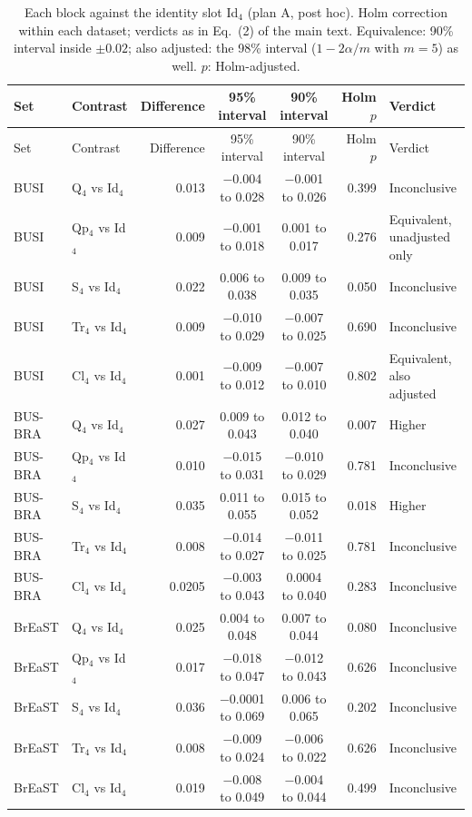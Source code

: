 \begin{longtable}{@{}llrccrl@{}}
\caption{Each block against the identity slot Id$_4$ (plan A, post hoc). Holm correction within each dataset; verdicts as in Eq.~(2) of the main text. Equivalence: 90\% interval inside $\pm0.02$; also adjusted: the 98\% interval ($1-2\alpha/m$ with $m=5$) as well. $p$: Holm-adjusted.}\label{stab:identity}\\
\toprule
Set & Contrast & Difference & 95\% interval & 90\% interval & Holm $p$ & Verdict \\
\midrule
\endfirsthead
\toprule
Set & Contrast & Difference & 95\% interval & 90\% interval & Holm $p$ & Verdict \\
\midrule
\endhead
BUSI & Q$_4$ vs Id$_4$ & 0.013 & $-$0.004 to 0.028 & $-$0.001 to 0.026 & 0.399 & Inconclusive \\
BUSI & Qp$_4$ vs Id$_4$ & 0.009 & $-$0.001 to 0.018 & 0.001 to 0.017 & 0.276 & Equivalent, unadjusted only \\
BUSI & S$_4$ vs Id$_4$ & 0.022 & 0.006 to 0.038 & 0.009 to 0.035 & 0.050 & Inconclusive \\
BUSI & Tr$_4$ vs Id$_4$ & 0.009 & $-$0.010 to 0.029 & $-$0.007 to 0.025 & 0.690 & Inconclusive \\
BUSI & Cl$_4$ vs Id$_4$ & 0.001 & $-$0.009 to 0.012 & $-$0.007 to 0.010 & 0.802 & Equivalent, also adjusted \\
BUS-BRA & Q$_4$ vs Id$_4$ & 0.027 & 0.009 to 0.043 & 0.012 to 0.040 & 0.007 & Higher \\
BUS-BRA & Qp$_4$ vs Id$_4$ & 0.010 & $-$0.015 to 0.031 & $-$0.010 to 0.029 & 0.781 & Inconclusive \\
BUS-BRA & S$_4$ vs Id$_4$ & 0.035 & 0.011 to 0.055 & 0.015 to 0.052 & 0.018 & Higher \\
BUS-BRA & Tr$_4$ vs Id$_4$ & 0.008 & $-$0.014 to 0.027 & $-$0.011 to 0.025 & 0.781 & Inconclusive \\
BUS-BRA & Cl$_4$ vs Id$_4$ & 0.0205 & $-$0.003 to 0.043 & 0.0004 to 0.040 & 0.283 & Inconclusive \\
BrEaST & Q$_4$ vs Id$_4$ & 0.025 & 0.004 to 0.048 & 0.007 to 0.044 & 0.080 & Inconclusive \\
BrEaST & Qp$_4$ vs Id$_4$ & 0.017 & $-$0.018 to 0.047 & $-$0.012 to 0.043 & 0.626 & Inconclusive \\
BrEaST & S$_4$ vs Id$_4$ & 0.036 & $-$0.0001 to 0.069 & 0.006 to 0.065 & 0.202 & Inconclusive \\
BrEaST & Tr$_4$ vs Id$_4$ & 0.008 & $-$0.009 to 0.024 & $-$0.006 to 0.022 & 0.626 & Inconclusive \\
BrEaST & Cl$_4$ vs Id$_4$ & 0.019 & $-$0.008 to 0.049 & $-$0.004 to 0.044 & 0.499 & Inconclusive \\
\bottomrule
\end{longtable}

